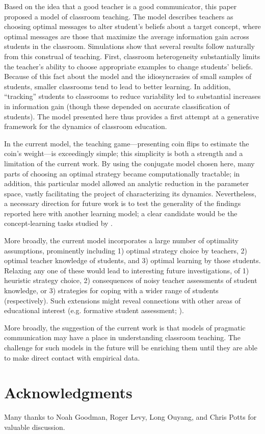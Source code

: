 \documentclass[10pt,letterpaper]{article}
\begin{document}
Based on the idea that a good teacher is a good communicator, this paper proposed a model of classroom teaching. The model describes teachers as choosing optimal messages to alter student's beliefs about a target concept, where optimal messages are those that maximize the average information gain across students in the classroom. Simulations show that several results follow naturally from this construal of teaching. First, classroom heterogeneity substantially limits the teacher's ability to choose appropriate examples to change students' beliefs. Because of this fact about the model and the idiosyncrasies of small samples of students, smaller classrooms tend to lead to better learning. In addition, ``tracking'' students to classrooms to reduce variability led to substantial increases in information gain (though these depended on accurate classification of students). The model presented here thus provides a first attempt at a generative framework for the dynamics of classroom education. 

In the current model, the teaching game---presenting coin flips to estimate the coin's weight---is exceedingly simple; this simplicity is both a strength and a limitation of the current work. By using the conjugate model chosen here, many parts of choosing an optimal strategy became computationally tractable; in addition, this particular model allowed an analytic reduction in the parameter space, vastly facilitating the project of characterizing its dynamics. Nevertheless, a necessary direction for future work is to test the generality of the findings reported here with another learning model; a clear candidate would be the concept-learning tasks studied by . 

More broadly, the current model incorporates a large number of optimality assumptions, prominently including 1) optimal strategy choice by teachers, 2) optimal teacher knowledge of students, and 3) optimal learning by those students. Relaxing any one of these would lead to interesting future investigations, of 1) heuristic strategy choice, 2) consequences of noisy teacher assessments of student knowledge, or 3) strategies for coping with a wider range of students (respectively). Such extensions might reveal connections with other areas of educational interest (e.g. formative student assessment; ). 

More broadly, the suggestion of the current work is that models of pragmatic communication may have a place in understanding classroom teaching. The challenge for such models in the future will be enriching them until they are able to make direct contact with empirical data. 

\section{Acknowledgments}

Many thanks to Noah Goodman, Roger Levy, Long Ouyang, and Chris Potts for valuable discussion.



\setlength{\bibleftmargin}{.125in}
\setlength{\bibindent}{-\bibleftmargin}


\end{document}
